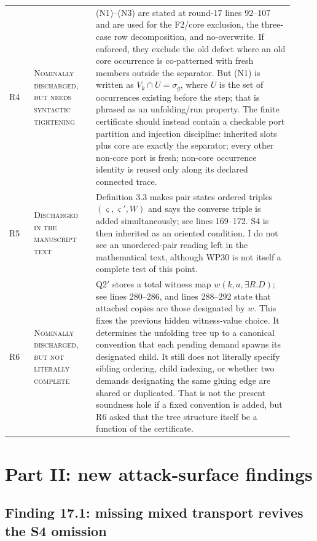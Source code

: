 \documentclass[11pt]{article}
\newcommand{\status}[1]{\textsc{#1}}
\begin{document}
\begin{longtable}{>{\raggedright\arraybackslash}p{0.08\linewidth} >{\raggedright\arraybackslash}p{0.20\linewidth} >{\raggedright\arraybackslash}p{0.64\linewidth}}
\addlinespace
R4 & \status{Nominally discharged, but needs syntactic tightening} & (N1)--(N3) are stated at round-17 lines 92--107 and are used for the F2/core exclusion, the three-case row decomposition, and no-overwrite.  If enforced, they exclude the old defect where an old core occurrence is co-patterned with fresh members outside the separator.  But (N1) is written as $V_k\cap U=\sigma_g$, where $U$ is the set of occurrences existing before the step; that is phrased as an unfolding/run property.  The finite certificate should instead contain a checkable port partition and injection discipline: inherited slots plus core are exactly the separator; every other non-core port is fresh; non-core occurrence identity is reused only along its declared connected trace. \\
\addlinespace
R5 & \status{Discharged in the manuscript text} & Definition 3.3 makes pair states ordered triples $(\varsigma,\varsigma',W)$ and says the converse triple is added simultaneously; see lines 169--172.  S4 is then inherited as an oriented condition.  I do not see an unordered-pair reading left in the mathematical text, although WP30 is not itself a complete test of this point. \\
\addlinespace
R6 & \status{Nominally discharged, but not literally complete} & Q2$'$ stores a total witness map $w(k,a,\exists R.D)$; see lines 280--286, and lines 288--292 state that attached copies are those designated by $w$.  This fixes the previous hidden witness-value choice.  It determines the unfolding tree up to a canonical convention that each pending demand spawns its designated child.  It still does not literally specify sibling ordering, child indexing, or whether two demands designating the same gluing edge are shared or duplicated.  That is not the present soundness hole if a fixed convention is added, but R6 asked that the tree structure itself be a function of the certificate. \\
\end{longtable}

\section{Part II: new attack-surface findings}

\subsection{Finding 17.1: missing mixed transport revives the S4 omission}
\end{document}
